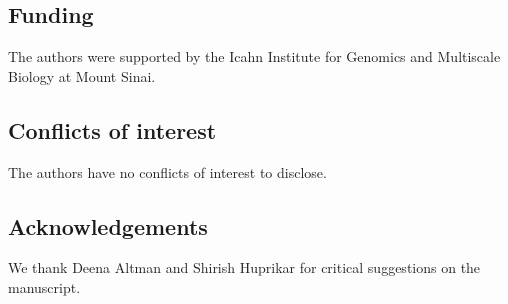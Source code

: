 \subsection*{Funding}

The authors were supported by the Icahn Institute for Genomics and Multiscale Biology at Mount Sinai.

\subsection*{Conflicts of interest}

The authors have no conflicts of interest to disclose.

\subsection*{Acknowledgements}

We thank Deena Altman and Shirish Huprikar for critical suggestions on the manuscript.